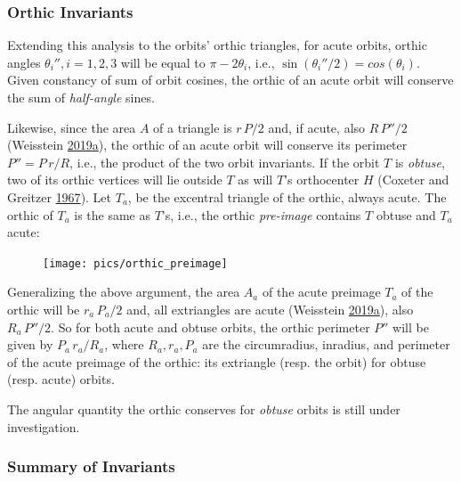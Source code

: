 \documentclass[]{article}
\begin{document}
\hypertarget{orthic-invariants}{%
\subsubsection{Orthic Invariants}\label{orthic-invariants}}

Extending this analysis to the orbits' orthic triangles, for acute orbits, orthic angles \(\theta_i'', i=1,2,3\) will be equal to \(\pi-2\theta_i\), i.e., \(\sin(\theta_i''/2)=cos(\theta_i)\). Given constancy of sum of orbit cosines, the orthic of an acute orbit will conserve the sum of \emph{half-angle} sines.

Likewise, since the area \(A\) of a triangle is \(r\,P/2\) and, if acute, also \(R\,P''/2\) (Weisstein \protect\hyperlink{ref-mw}{2019}\protect\hyperlink{ref-mw}{a}), the orthic of an acute orbit will conserve its perimeter \(P''=P\,r/R\), i.e., the product of the two orbit invariants. If the orbit \(T\) is \emph{obtuse}, two of its orthic vertices will lie outside \(T\) as will \(T\)'s orthocenter \(H\) (Coxeter and Greitzer \protect\hyperlink{ref-coxeter67}{1967}). Let \(T_a\), be the excentral triangle of the orthic, always acute. The orthic of \(T_a\) is the same as \(T\)'s, i.e., the orthic \emph{pre-image} contains \(T\) obtuse and \(T_a\) acute:

\begin{figure}[H]

{\centering \texttt{[image: pics/orthic\_preimage]} 

}

\end{figure}

Generalizing the above argument, the area \(A_a\) of the acute preimage \(T_a\) of the orthic will be \(r_a\,P_a/2\) and, all extriangles are acute (Weisstein \protect\hyperlink{ref-mw}{2019}\protect\hyperlink{ref-mw}{a}), also \(R_a\,P''/2\). So for both acute and obtuse orbits, the orthic perimeter \(P''\) will be given by \(P_a\,r_a/R_a\), where \(R_a,r_a,P_a\) are the circumradius, inradius, and perimeter of the acute preimage of the orthic: its extriangle (resp. the orbit) for obtuse (resp. acute) orbits.

The angular quantity the orthic conserves for \emph{obtuse} orbits is still under investigation.

\hypertarget{summary-of-invariants}{%
\subsubsection{Summary of Invariants}\label{summary-of-invariants}}
\end{document}
